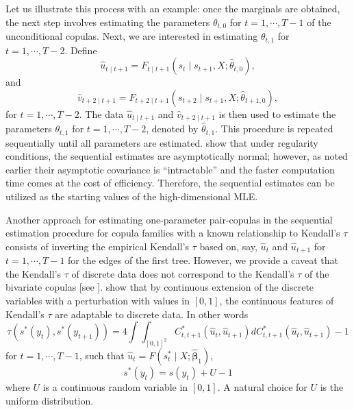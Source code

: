 \documentclass[harvard,11pt]{article}
\begin{document}
Let us illustrate this process with an example: once the marginals are obtained, the next step involves estimating the parameters $\theta_{t,0}$ for $t=1,\cdots,T-1$ of the unconditional copulas. Next, we are interested in estimating $\theta_{t,1}$ for $t=1,\cdots,T-2$. Define
\[
\hat{u}_{t\mid t+1}=F_{t\mid t+1}\left(s_t\mid s_{t+1},X;\hat{\theta}_{t,0} \right),
\]  
and
\[
\hat{v}_{t+2\mid t+1}=F_{t+2\mid t+1}\left(s_{t+2}\mid s_{t+1},X;\hat{\theta}_{t+1,0} \right),
\]
for $t=1,\cdots,T-2$. The data $\hat{u}_{t\mid t+1}$ and $\hat{v}_{t+2\mid t+1}$ is then used to estimate the parameters $\theta_{t,1}$ for $t=1,\cdots,T-2$, denoted by $\hat{\theta}_{t,1}$. This procedure is repeated sequentially until all parameters are estimated. \citet{haff2010simplified} show that under regularity conditions, the sequential estimates are asymptotically normal; however, as noted earlier their asymptotic covariance is \textquotedblleft intractable\textquotedblright{ }and the faster computation time comes at the cost of efficiency. Therefore, the sequential estimates can be utilized as the starting values of the high-dimensional MLE.

Another approach for estimating one-parameter pair-copulas in the sequential estimation procedure for copula families with a known relationship to Kendall's $\tau$ consists of inverting the empirical Kendall's $\tau$ based on, say, $\hat{u}_{t}$ and $\hat{u}_{t+1}$ for $t=1,\cdots,T-1$ for the edges of the first tree. However, we provide a caveat that the Kendall's $\tau$ of discrete data does not correspond to the Kendall's $\tau$ of the bivariate copulas [see \citet{denuit2005constraints}]. \citet{denuit2005constraints} show that by continuous extension of the discrete variables with a perturbation with values in $[0,1]$, the continuous features of Kendall's $\tau$ are adaptable to discrete data. In other words
\[ 
\tau(s^*(y_{t}),s^*(y_{t+1}))=4\int\int_{[0,1]^2}C_{t,t+1}^*\left(\hat{u}_{t},\hat{u}_{t+1}\right)dC_{t,t+1}^*\left(\hat{u}_{t},\hat{u}_{t+1}\right)-1
\]
for $t=1,\cdots,T-1$, such that $\hat{u}_{t}=F\left(s^*_t\mid X;\hat{\bm{\beta}}_1\right)$,
\[
s^*(y_t)=s(y_t)+U-1
\]
where $U$ is a continuous random variable in $[0,1]$. A natural choice for $U$ is the uniform distribution.
\end{document}
